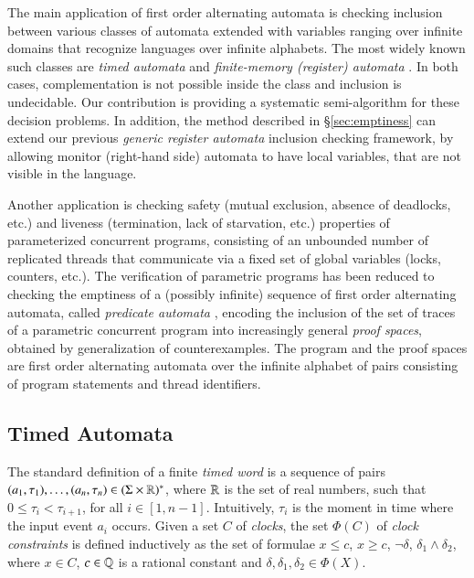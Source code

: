 The main application of first order alternating automata is checking
inclusion between various classes of automata extended with variables
ranging over infinite domains that recognize languages over infinite
alphabets. The most widely known such classes are \emph{timed
  automata} \cite{AlurDill94} and \emph{finite-memory (register)
  automata} \cite{KaminskiFrancez94}. In both cases, complementation
is not possible inside the class and inclusion is undecidable. Our
contribution is providing a systematic semi-algorithm for these
decision problems. In addition, the method described in
\S\ref{sec:emptiness} can extend our previous \emph{generic register
  automata} \cite{IosifRV16} inclusion checking framework, by allowing
monitor (right-hand side) automata to have local variables, that are
not visible in the language.

Another application is checking safety (mutual exclusion, absence of
deadlocks, etc.) and liveness (termination, lack of starvation, etc.)
properties of parameterized concurrent programs, consisting of an
unbounded number of replicated threads that communicate via a fixed
set of global variables (locks, counters, etc.). The verification of
parametric programs has been reduced to checking the emptiness of a
(possibly infinite) sequence of first order alternating automata,
called \emph{predicate automata} \cite{Farzan15,Farzan16}, encoding
the inclusion of the set of traces of a parametric concurrent program
into increasingly general \emph{proof spaces}, obtained by
generalization of counterexamples. The program and the proof spaces
are first order alternating automata over the infinite alphabet of
pairs consisting of program statements and thread identifiers.

\subsection{Timed Automata}
\label{sec:ta}

The standard definition of a finite \emph{timed word} is a sequence of
pairs $(a_1,\tau_1), \ldots, (a_n,\tau_n) \in (\Sigma \times
{\bf \mathbb{R}})^*$, where ${\bf \mathbb{R}}$ is the set of real numbers, such that $0 \leq
\tau_i < \tau_{i+1}$, for all $i \in [1,n-1]$. Intuitively, $\tau_i$
is the moment in time where the input event $a_i$ occurs. Given a set
$C$ of \emph{clocks}, the set $\Phi(C)$ of \emph{clock constraints} is
defined inductively as the set of formulae $x \leq c$, $x \geq c$,
$\neg\delta$, $\delta_1 \wedge \delta_2$, where $x \in C$, $c \in
{\bf \mathbb{Q}}$ is a rational constant and $\delta,\delta_1,\delta_2 \in
\Phi(X)$. 

